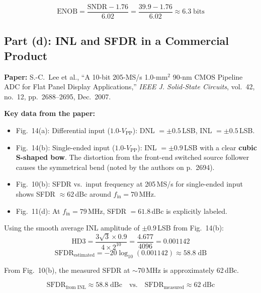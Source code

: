 \documentclass{article}
\begin{document}
\begin{equation}
    \boxed{\text{ENOB} = \frac{\text{SNDR} - 1.76}{6.02} = \frac{39.9 - 1.76}{6.02} \approx 6.3\;\text{bits}}
\end{equation}

\subsection{Part (d): INL and SFDR in a Commercial Product}

\textbf{Paper:} S.-C.~Lee et al., ``A 10-bit 205-MS/s 1.0-mm$^2$ 90-nm CMOS Pipeline ADC for Flat Panel Display Applications,'' \textit{IEEE J. Solid-State Circuits}, vol.~42, no.~12, pp.~2688--2695, Dec.~2007.

\textbf{Key data from the paper:}
\begin{itemize}
    \item Fig.~14(a): Differential input ($1.0$-$V_\text{PP}$): DNL $= \pm 0.5$\,LSB, INL $= \pm 0.5$\,LSB.
    \item Fig.~14(b): Single-ended input ($1.0$-$V_\text{PP}$): INL $= \pm 0.9$\,LSB with a clear \textbf{cubic S-shaped bow}. The distortion from the front-end switched source follower causes the symmetrical bend (noted by the authors on p.~2694).
    \item Fig.~10(b): SFDR vs.\ input frequency at 205\,MS/s for single-ended input shows SFDR $\approx 62$\,dBc around $f_\text{in} = 70$\,MHz.
    \item Fig.~11(d): At $f_\text{in} = 79$\,MHz, SFDR $= 61.8$\,dBc is explicitly labeled.
\end{itemize}

Using the smooth average INL amplitude of $\pm 0.9$\,LSB from Fig.~14(b):
\begin{equation}
    \text{HD3} = \frac{3\sqrt{3} \times 0.9}{4 \times 2^{10}} = \frac{4.677}{4096} = 0.001142
\end{equation}
\begin{equation}
    \text{SFDR}_\text{estimated} = -20\log_{10}(0.001142) \approx 58.8\;\text{dB}
\end{equation}

From Fig.~10(b), the measured SFDR at $\sim$70\,MHz is approximately 62\,dBc.

\begin{equation}
    \boxed{\text{SFDR}_\text{from INL} \approx 58.8\;\text{dBc} \quad\text{vs.}\quad \text{SFDR}_\text{measured} \approx 62\;\text{dBc}}
\end{equation}
\end{document}
